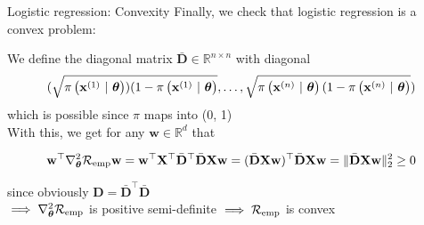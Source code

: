 \documentclass[11pt,compress,t,notes=noshow, xcolor=table]{beamer}
\begin{document}
\begin{frame}{Logistic regression: Convexity}
Finally, we check that logistic regression is a convex problem:
\vfill

We define the diagonal matrix $\bar{\mathbf{D}} \in \mathbb{R}^{n \times n}$ with diagonal 
$$(\sqrt{\pixit[1])(1-\pixit[1]}, \dots, \sqrt{\pixit[n](1-\pixit[n]}) $$
which is possible since $\pi$ maps into (0, 1) \\
\vfill
With this, we get for any $\mathbf{w} \in \mathbb{R}^d$ that

$$\mathbf{w}^\top  \nabla^2_{\thetav}\riske \mathbf{w} =   \mathbf{w}^\top  \mathbf{X}^\top \bar{\mathbf{D}}^\top \bar{\mathbf{D}}\mathbf{X} \mathbf{w} = (\bar{\mathbf{D}}\mathbf{X} \mathbf{w})^\top\bar{\mathbf{D}}\mathbf{X} \mathbf{w} = \Vert \bar{\mathbf{D}}\mathbf{X} \mathbf{w} \Vert^2_2 \geq 0$$

since obviously $\mathbf{D} = \bar{\mathbf{D}}^\top \bar{\mathbf{D}}$ \\
\vfill
$\implies \nabla^2_{\thetav}\riske$ is positive semi-definite $\implies \riske$ is convex

\end{frame}

\endlecture
\end{document}
